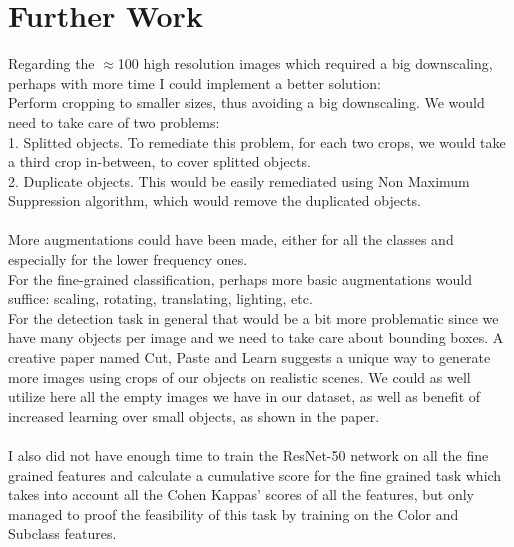 \documentclass[]{article}
\begin{document}
\section{Further Work}
Regarding the $\approx$100 high resolution images which required a big downscaling, perhaps with more time I could implement a better solution:\\
Perform cropping to smaller sizes, thus avoiding a big downscaling. We would need to take care of two problems:\\
1. Splitted objects. To remediate this problem, for each two crops, we would take a third crop in-between, to cover splitted objects.\\
2. Duplicate objects. This would be easily remediated using Non Maximum Suppression algorithm, which would remove the duplicated objects.
\\\\
More augmentations could have been made, either for all the classes and especially for the lower frequency ones.\\
For the fine-grained classification, perhaps more basic augmentations would suffice: scaling, rotating, translating, lighting, etc.\\
For the detection task in general that would be a bit more problematic since we have many objects per image and we need to take care about bounding boxes. A creative paper named Cut, Paste and Learn \cite{cutpastelearn}  suggests a unique way to generate more images using crops of our objects on realistic scenes. We could as well utilize here all the empty images we have in our dataset, as well as benefit of increased learning over small objects, as shown in the paper.
\\\\
I also did not have enough time to train the ResNet-50 network on all the fine grained features and calculate a cumulative score for the fine grained task which takes into account all the Cohen Kappas' scores of all the features, but only managed to proof the feasibility of this task by training on the Color and Subclass features.
\end{document}
